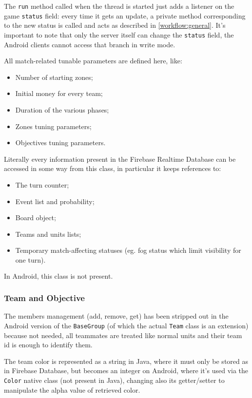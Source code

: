 				The \lstinline|run| method called when the thread is started just adds a listener on the game \lstinline|status| field: every time it gets an update, a private method corresponding to the new status is called and acts as described in \autoref{workflow:general}.
				It's important to note that only the server itself can change the \lstinline|status| field, the Android clients cannot access that branch in write mode.
				
				All match-related tunable parameters are defined here, like:
				\begin{itemize}
					\item Number of starting zones;
					\item Initial money for every team;
					\item Duration of the various phases;
					\item Zones tuning parameters;
					\item Objectives tuning parameters.
				\end{itemize}
			
				Literally every information present in the Firebase Realtime Database can be accessed in some way from this class, in particular it keeps references to:
				\begin{itemize}
					\item The turn counter;
					\item Event list and probability;
					\item Board object;
					\item Teams and units lists;
					\item Temporary match-affecting statuses (eg. fog status which limit visibility for one turn).
				\end{itemize}
			
				In Android, this class is not present.
				
			\subsubsection{Team and Objective}
			
				The members management (add, remove, get) has been stripped out in the Android version of the \lstinline|BaseGroup| (of which the actual \lstinline|Team| class is an extension) because not needed, all teammates are treated like normal units and their team id is enough to identify them. 
				
				The team color is represented as a string in Java, where it must only be stored as in Firebase Database, but becomes an integer on Android, where it's used via the \lstinline|Color| native class (not present in Java), changing also its getter/setter to manipulate the alpha value of retrieved color.
				

